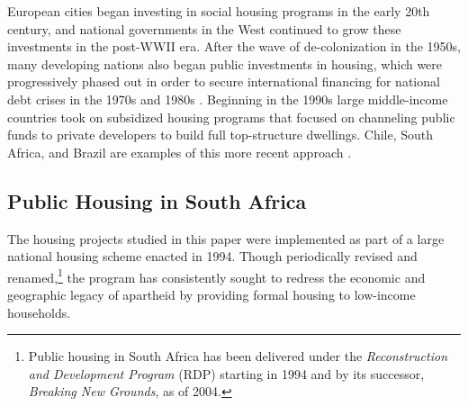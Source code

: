 \documentclass[12pt]{article}
\begin{document}
European cities began investing in social housing programs in the early 20th century, and national governments in the West continued to grow these investments in the post-WWII era. After the wave of de-colonization in the 1950s, many developing nations also began public investments in housing, which were progressively phased out in order to secure international financing for national debt crises in the 1970s and 1980s \citep{rondinelli1990housing}. Beginning in the 1990s large middle-income countries took on subsidized housing programs that focused on channeling public funds to private developers to build full top-structure dwellings. Chile, South Africa, and Brazil are examples of this more recent approach \citep{buckley2005housing}.


\subsection{Public Housing in South Africa}


The housing projects studied in this paper were implemented as part of a large national housing scheme enacted in 1994. Though periodically revised and renamed,\footnote{Public housing in South Africa has been delivered under the {\it Reconstruction and Development Program} (RDP) starting in 1994 and  by its successor, {\it Breaking New Grounds}, as of 2004.} the program has consistently sought to redress the economic and geographic legacy of apartheid by providing formal housing to low-income households.  
\end{document}

